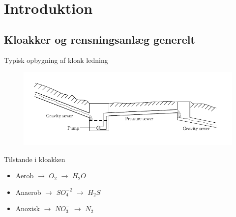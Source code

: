 

\section{Introduktion} %


\subsection{Kloakker og rensningsanlæg generelt} %
\begin{frame}{Typisk opbygning af kloak ledning}{}
\vfill\vfill\centering
\begin{figure}[H]
\centering
\includegraphics[width=1\textwidth]{Sections/pictures/Sewer_drawing.pdf}
\end{figure}
\vfill\vfill
\end{frame}
%

\begin{frame}{Tilstande i kloakken}
\vfill\vfill\centering
\begin{itemize}
	\item<1-> Aerob $\rightarrow$ $O_2$ $\rightarrow$ $H_2O$
	\vspace{4mm}
	\item<2-> Anaerob $\rightarrow$ $SO_4^{-2}$ $\rightarrow$ $H_2S$
	\vspace{4mm}
	\item<3-> Anoxisk $\rightarrow$ $NO_3^-$ $\rightarrow$ $N_2$
\end{itemize}
\vfill\vfill	
\end{frame}

